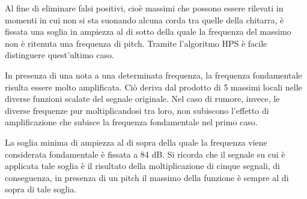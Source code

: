 Al fine di eliminare falsi positivi, cioè massimi che possono essere rilevati in momenti in cui non si sta suonando alcuna corda tra quelle della chitarra, è fissata una soglia in ampiezza al di sotto della quale la frequenza del massimo non è ritenuta una frequenza di pitch.
Tramite l'algoritmo \mbox{HPS} è facile distinguere quest'ultimo caso.

In presenza di una nota a una determinata frequenza, la frequenza fondamentale risulta essere molto amplificata.
Ciò deriva dal prodotto di 5 massimi locali nelle diverse funzioni scalate del segnale originale.
Nel caso di rumore, invece, le diverse frequenze pur moltiplicandosi tra loro, non subiscono l'effetto di amplificazione che subisce la frequenza fondamentale nel primo caso.

La soglia minima di ampiezza al di sopra della quale la frequenza viene considerata fondamentale è fissata a 84 dB.
Si ricorda che il segnale su cui è applicata tale soglia è il risultato della moltiplicazione di cinque segnali, di conseguenza, in presenza di un pitch il massimo della funzione è sempre al di sopra di tale soglia.


